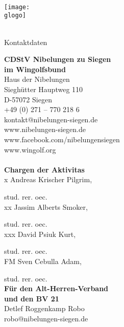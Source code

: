 \newcommand \gvierteSeiteTitel {Kontaktdaten}

\newcommand \gvierteSeite {
	\textbf{CDStV Nibelungen zu Siegen\\im Wingolfsbund}\\
	Haus der Nibelungen\\
	Sieghütter Hauptweg 110\\
	D-57072 Siegen \\
	+49 (0) 271 -- 770 218 6\\
	kontakt@nibelungen-siegen.de\\
	www.nibelungen-siegen.de\\
	www.facebook.com/nibelungensiegen\\
	www.wingolf.org\\
	\\
	\textbf{Chargen der Aktivitas}\\
	\setlength\parindent{24pt}
	x	Andreas Krischer \vulgo Pilgrim,
	\par stud. rer. oec.\\
	xx	Jassim Alberts \vulgo Smoker,
	\par stud. rer. oec.\\
	xxx	David Psiuk \vulgo Kurt,
	\par stud. rer. oec.\\
	FM	Sven Cebulla \vulgo Adam,
	\par stud. rer. oec.
	\setlength\parindent{0pt}
	\\
	\textbf{Für den Alt-Herren-Verband\\und den BV 21}\\
	Detlef Roggenkamp \vulgo Robo\\
	robo@nibelungen-siegen.de\\
} 




\newcommand \lersteSeite {
		
		\gorga \\
		{\fontsize {\gsgL}{\dls} \selectfont \gorgb} \\
		\gorgc \\	
		\texttt{[image: \\glogo]}
		{\fontsize {\gsgL}{\dls} \selectfont \gsempro} \\
		\gsem \\
}

\neueSeite
	{\ohneKopzeile}
	{\zentriert}
	{\ohneTitel}
	{\lersteSeite}	


\neueSeite
	{\mitKopfzeile}
	{\linksbuending}
	{\gzweiteSeiteTitel}
	{\gzweiteSeite}
	

\neueSeite
	{\mitKopfzeile}
	{\linksbuending}
	{\gdritteSeiteTitel}
	{\gdritteSeite}
	

\neueSeite
	{\mitKopfzeile}
	{\linksbuending}
	{\gvierteSeiteTitel}
	{\gvierteSeite}
